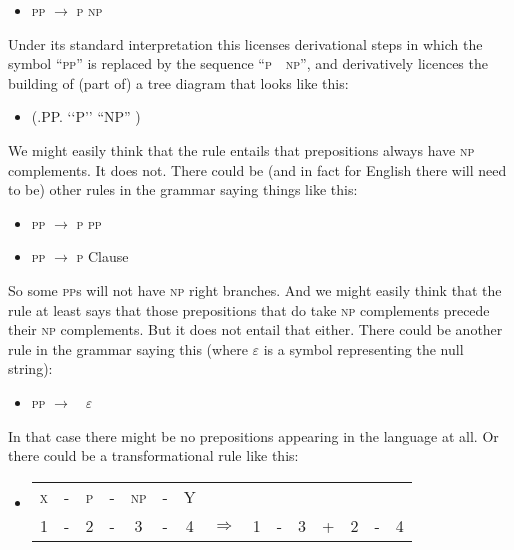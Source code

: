 \documentclass[output=paper]{langscibook}
\begin{document}
\begin{itemize} 
\item[]  \textsc{pp} \quad $\rightarrow$ \quad \textsc{p} \quad \textsc{np}
\end{itemize} 

Under its standard interpretation this licenses derivational steps in which the symbol ``\textsc{pp}'' is replaced by the sequence ``\textsc{p}~~\textsc{np}'', and derivatively licences the building of (part of) a tree diagram that looks like this:

\begin{itemize} 
\item[] (.PP. `{`\rm P}'' ``{\rm NP}'' )
\end{itemize} 

We might easily think that the rule entails that prepositions always have \textsc{np} complements. It does not. There could be (and in fact for English there will need to be) other rules in the grammar saying things like this:

\begin{itemize}
 \item[]  \textsc{pp} \quad $\rightarrow$ \quad \textsc{p} \quad \textsc{pp} 
 \item[]  \textsc{pp} \quad $\rightarrow$ \quad \textsc{p} \quad Clause 
\end{itemize} 

So some \textsc{pp}s will not have \textsc{np} right branches. And we might easily think that the rule at least says that those prepositions that do take \textsc{np} complements precede their \textsc{np} complements. But it does not entail that either. There could be another rule in the grammar saying this (where $\varepsilon$ is a symbol representing the null string):

\begin{itemize} 
\item[]  \textsc{pp} \quad $\rightarrow \quad \varepsilon$ 
\end{itemize} 

In that case there might be no prepositions appearing in the language at all. Or there could be a transformational rule like this:

\begin{itemize} 
\item[]
\begin{tabular}[t]{ccccccccccccccc} \textsc{x} & - & \textsc{p} & - & \textsc{np} & - & Y \\ 1 & - & 2 & - & 3  & - & 4 & $\Rightarrow$ & 1 & - & 3 & + & 2  & - & 4  
\end{tabular} 
\end{itemize} 
\end{document}
